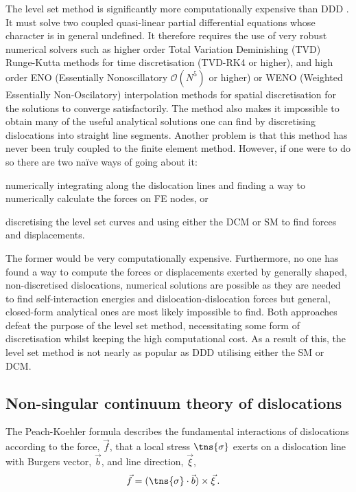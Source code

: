 The level set method is significantly more computationally expensive than DDD \cite{lvl_set_dd}. It must solve two coupled quasi-linear partial differential equations whose character is in general undefined. It therefore requires the use of very robust numerical solvers such as higher order Total Variation Deminishing (TVD) Runge-Kutta methods for time discretisation (TVD-RK4 or higher), and high order ENO (Essentially Nonoscillatory $ \mathcal{O}(N^5) $ or higher) or WENO (Weighted Essentially Non-Oscilatory) interpolation methods for spatial discretisation \cite{lvl_set_ddd_inc} for the solutions to converge satisfactorily. The method also makes it impossible to obtain many of the useful analytical solutions one can find by discretising dislocations into straight line segments. Another problem is that this method has never been truly coupled to the finite element method. However, if one were to do so there are two naïve ways of going about it:
\begin{inparaenum}
    \item numerically integrating along the dislocation lines and finding a way to numerically calculate the forces on FE nodes, or
    \item discretising the level set curves and using either the DCM or SM to find forces and displacements.
\end{inparaenum}
The former would be very computationally expensive. Furthermore, no one has found a way to compute the forces or displacements exerted by generally shaped, non-discretised dislocations, numerical solutions are possible as they are needed to find self-interaction energies and dislocation-dislocation forces \cite{lvl_set_dd} but general, closed-form analytical ones are most likely impossible to find. Both approaches defeat the purpose of the level set method, necessitating some form of discretisation whilst keeping the high computational cost. As a result of this, the level set method is not nearly as popular as DDD utilising either the SM or DCM.

\subsection{Non-singular continuum theory of dislocations}
\label{ss:non-singular_dln}

The Peach-Koehler formula describes the fundamental interactions of dislocations \cite{pk_force} according to the force, $ \vec{f} $, that a local stress $ \tns{\sigma} $ exerts on a dislocation line with Burgers vector, $ \vec{b} $, and line direction, $ \vec{\xi} $,
\begin{align}
    \vec{f} & = (\tns{\sigma} \cdot \vec{b}) \times \vec{\xi}\,.
\end{align}

